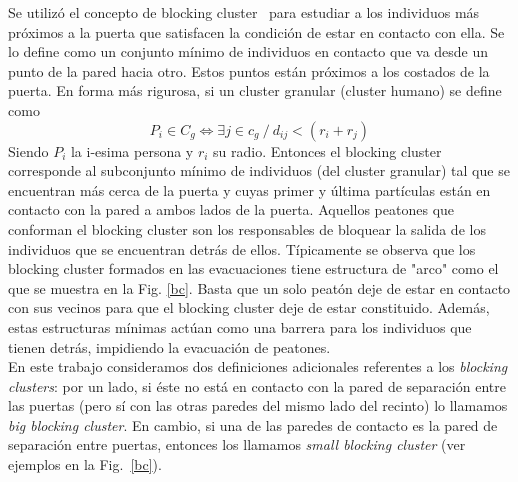 Se utilizó el concepto de blocking cluster~\cite{Dorso1} para estudiar a los individuos más próximos a la puerta que satisfacen la condición de estar en contacto con ella.
Se lo define como un conjunto mínimo de individuos en contacto que va desde un punto de la pared hacia otro. Estos puntos están próximos a los costados de la puerta. En forma más rigurosa, si un cluster granular (cluster humano) se define como 
\begin{equation}
P_i \in C_g \Longleftrightarrow \exists j \in c_g ~/~ d_{ij}<(r_i+r_j)
\end{equation} 
Siendo $P_i$  la i-esima persona y $r_i$ su radio. Entonces el blocking cluster corresponde al subconjunto mínimo de individuos (del cluster granular) tal que se encuentran más cerca de la puerta y cuyas primer y última partículas están en contacto con la pared a ambos lados de la puerta.   
Aquellos peatones que conforman el blocking cluster son los responsables de bloquear la salida de los individuos que se encuentran detrás de ellos. Típicamente se observa que los blocking cluster formados en las evacuaciones tiene estructura de "arco" como el que se muestra en la Fig. \ref{bc}. Basta que un solo peatón deje de estar en contacto con sus vecinos para que el blocking cluster deje de estar constituido. Además, estas estructuras mínimas actúan como una barrera para los individuos que tienen detrás, impidiendo la evacuación de peatones. \\

En este trabajo consideramos dos definiciones adicionales referentes a los \textit{blocking clusters}: por un lado, si éste no está en contacto con la pared de separación entre las puertas (pero sí con las otras paredes del mismo lado del recinto) lo llamamos \textit{big blocking cluster}. En cambio, si una de las paredes de contacto es la pared de separación entre puertas, entonces los llamamos \textit{small blocking cluster} (ver ejemplos en la Fig.~\ref{bc}).

